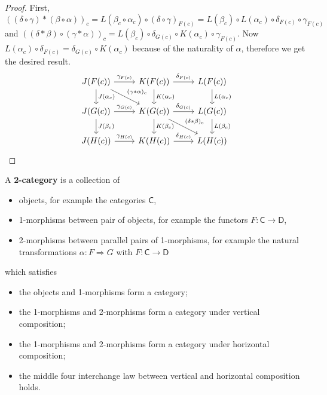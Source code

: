 \begin{proof}
First, $((\delta\circ \gamma)*(\beta\circ \alpha))_c=L(\beta_c\circ \alpha_c)\circ (\delta\circ \gamma)_{F(c)}=L(\beta_c)\circ L(\alpha_c)\circ \delta_{F(c)}\circ \gamma_{F(c)}$ and $((\delta*\beta)\circ (\gamma*\alpha))_c=L(\beta_c)\circ \delta_{G(c)}\circ K(\alpha_c)\circ\gamma_{F(c)}$. Now $L(\alpha_c)\circ \delta_{F(c)}=\delta_{G(c)}\circ K(\alpha_c)$ because of the naturality of $\alpha$, therefore we get the desired result.
\begin{equation}
\begin{tikzcd}
J(F(c))\arrow[r,"\gamma_{F(c)}"]\arrow[d,"J(\alpha_c)"]\arrow[rd,"(\gamma*\alpha)_c"] & K(F(c))\arrow[d,"K(\alpha_c)"]\arrow[r,"\delta_{F(c)}"]&L(F(c))\arrow[d,"L(\alpha_c)"]\\
J(G(c))\arrow[r,"\gamma_{G(c)}"]\arrow[d,"J(\beta_c)"] & K(G(c))\arrow[r,"\delta_{G(c)}"]\arrow[d,"K(\beta_c)"]\arrow[rd,"(\delta*\beta)_c"]&L(G(c))\arrow[d,"L(\beta_c)"]\\
J(H(c))\arrow[r,"\gamma_{H(c)}"]&K(H(c))\arrow[r,"\delta_{H(c)}"]&L(H(c))
\end{tikzcd}
\end{equation}
\end{proof}

\begin{defn} A \textbf{2-category} is a collection of
\begin{itemize}
\item objects, for example the categories $\mathsf{C}$,
\item 1-morphisms between pair of objects, for example the functors $F:\mathsf{C}\rightarrow \mathsf{D}$,
\item 2-morphisms between parallel pairs of 1-morphisms, for example the natural transformations $\alpha:F\Rightarrow G$ with $F:\mathsf{C}\rightarrow \mathsf{D}$
\end{itemize}
which satisfies
\begin{itemize}
\item the objects and 1-morphisms form a category;
\item the 1-morphisms and 2-morphisms form a category under vertical composition;
\item the 1-morphisms and 2-morphisms form a category under horizontal composition;
\item the middle four interchange law between vertical and horizontal composition holds.
\end{itemize}
\end{defn}

